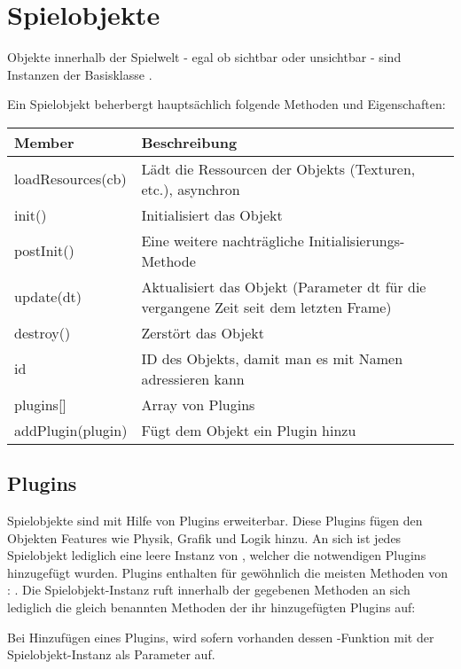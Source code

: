 \chapter{Spielobjekte}

Objekte innerhalb der Spielwelt - egal ob sichtbar oder unsichtbar - sind Instanzen der Basisklasse . 

Ein Spielobjekt beherbergt hauptsächlich folgende Methoden und Eigenschaften:

\begin{tabular}{|l|l|}
\hline 
Member & Beschreibung \\ 
\hline 
loadResources(cb) & Lädt die Ressourcen der Objekts (Texturen, etc.), asynchron \\ 
\hline 
init() & Initialisiert das Objekt \\ 
\hline 
postInit() & Eine weitere nachträgliche Initialisierungs-Methode \\ 
\hline 
update(dt) & Aktualisiert das Objekt (Parameter dt für die vergangene Zeit seit dem letzten Frame) \\ 
\hline 
destroy() & Zerstört das Objekt \\ 
\hline
id & ID des Objekts, damit man es mit Namen adressieren kann \\
\hline
plugins[] & Array von Plugins \\
\hline
addPlugin(plugin) & Fügt dem Objekt ein Plugin hinzu \\
\hline 
\end{tabular} 

\section{Plugins}

Spielobjekte sind mit Hilfe von Plugins erweiterbar. Diese Plugins fügen den Objekten Features wie Physik, Grafik und Logik hinzu. An sich ist jedes Spielobjekt lediglich eine leere Instanz von , welcher die notwendigen Plugins hinzugefügt wurden. Plugins enthalten für gewöhnlich die meisten Methoden von : . Die Spielobjekt-Instanz ruft innerhalb der gegebenen Methoden an sich lediglich die gleich benannten Methoden der ihr hinzugefügten Plugins auf:


Bei Hinzufügen eines Plugins, wird sofern vorhanden dessen -Funktion mit der Spielobjekt-Instanz als Parameter auf.

